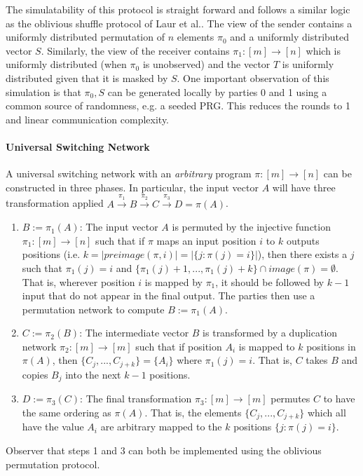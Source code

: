 The simulatability of this protocol is straight forward and follows a similar logic as the oblivious shuffle protocol of Laur et al.\cite{LWZ11}. The view of the sender contains a uniformly distributed permutation of $n$ elements $\pi_0$ and a uniformly distributed vector $S$. Similarly, the view of the receiver contains $\pi_1: [m]\rightarrow [n]$ which is uniformly distributed (when $\pi_0$ is unobserved) and the vector $T$ is uniformly distributed given that it is masked by $S$. One important observation of this simulation is that $\pi_0,S$ can be generated locally by parties 0 and 1 using a common source of randomness, e.g. a seeded PRG. This reduces the rounds to 1 and linear communication complexity. 

\paragraph{Universal Switching Network}

A universal switching network with an \emph{arbitrary} program $\pi : [m]\rightarrow [n]$ can be constructed in three phases\cite{MS13, CMRS18}. In particular, the input vector $A$ will have three transformation applied $A\overset{\pi_1}{\rightarrow}B\overset{\pi_2}{\rightarrow}C\overset{\pi_3}{\rightarrow}D=\pi(A)$.
\begin{enumerate}
	\item $B:=\pi_1(A)$:  The input vector $A$ is permuted by the injective function $\pi_1:[m]\rightarrow[n]$ such that if $\pi$ maps an input position $i$ to $k$ outputs positions (i.e. $k=|preimage(\pi,i)|=|\{ j : \pi(j)=i \}|$), then there exists a $j$ such that $\pi_1(j)=i$  and $\{\pi_1(j)+ 1,...,\pi_1(j )+k \} \cap image(\pi) = \emptyset$. That is, wherever position $i$ is mapped by $\pi_1$, it should be followed by $k-1$ input that do not appear in the final output. The parties then use a permutation network to compute $B:=\pi_1(A)$.
	
	\item $C:=\pi_2(B)$: The intermediate vector $B$ is transformed by a duplication network $\pi_2:[m]\rightarrow[m]$ such that if position $A_i$ is mapped to $k$ positions in $\pi(A)$, then $\{ C_{j},...,C_{j+k}\} = \{A_i\}$ where $\pi_1(j)=i$. That is, $C$ takes $B$ and copies $B_{j}$ into the next $k-1$ positions. 
	
	\item $D:=\pi_3(C)$: The final transformation $\pi_3:[m]\rightarrow[m]$  permutes $C$ to have the same ordering as $\pi(A)$. That is, the elements $\{ C_{j},...,C_{j+k}\}$ which all have the value  $A_i$ are arbitrary mapped to the $k$ positions $\{ j : \pi(j)=i \}$.
\end{enumerate}
Observer that steps 1 and 3 can both be implemented using the oblivious permutation protocol.%

